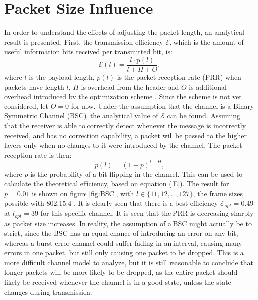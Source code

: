 \section{Packet Size Influence}
In order to understand the effects of adjusting the packet length, an analytical result is presented. First, the transmission efficiency $\mathcal{E}$, which is the amount of useful information bits received per transmitted bit, is:
\begin{equation}
\mathcal{E}(l) = \frac{l\cdot \text{p}(l)}{l + H + O},\label{E}
\end{equation}
where $l$ is the payload length, $p(l)$ is the packet reception rate (PRR) when packets have length $l$, $H$ is overhead from the header and $O$ is additional overhead introduced by the optimization scheme \cite{DPLCpaper}. Since the scheme is not yet considered, let $O=0$ for now. Under the assumption that the channel is a Binary Symmetric Channel (BSC), the analytical value of $\mathcal{E}$ can be found. Assuming that the receiver is able to correctly detect whenever the message is incorrectly received, and has no correction capability, a packet will be passed to the higher layers only when no changes to it were introduced by the channel. The packet reception rate is then:
\begin{equation}
p(l) = (1 - p)^{l+H},
\end{equation}
where $p$ is the probability of a bit flipping in the channel. This can be used to calculate the theoretical efficiency, based on equation (\ref{E}). The result for $p=0.01$ is shown on figure \ref{fig:BSC}, with $l\in \{11,12,...,127\}$, the frame sizes possible with 802.15.4 \cite{CC2420}. It is clearly seen that there is a best efficiency $\mathcal{E}_{opt} = 0.49$ at $l_{opt} = 39$ for this specific channel. It is seen that the PRR is decreasing sharply as packet size increases. In reality, the assumption of a BSC might actually be to strict, since the BSC has an equal chance of introducing an error on any bit, whereas a burst error channel could suffer fading in an interval, causing many errors in one packet, but still only causing one packet to be dropped. This is a more difficult channel model to analyze, but it is still reasonable to conclude that longer packets will be more likely to be dropped, as the entire packet should likely be received whenever the channel is in a good state, unless the state changes during transmission.
